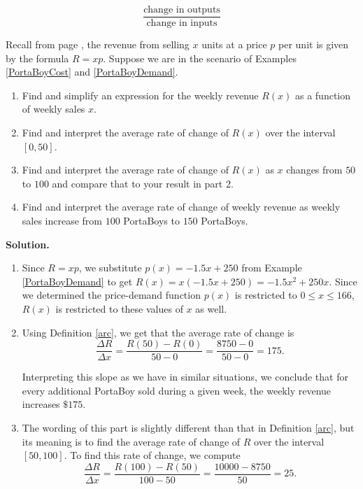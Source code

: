 \[ \dfrac{\mbox{change in outputs}}{\mbox{change in inputs}}\] 

\begin{ex} Recall from page  \pageref{pricerevenuecostprofit}, the revenue from selling $x$ units at a price $p$ per unit is given by the formula  $R=xp$.  Suppose we are in the scenario of Examples \ref{PortaBoyCost} and \ref{PortaBoyDemand}.
\label{PortaBoyRevenue}

\begin{enumerate}

\item  Find and simplify an expression for the weekly revenue $R(x)$ as a function of weekly sales $x$.

\item  Find and interpret the average rate of change of $R(x)$ over the interval $[0,50]$.

\item  Find and interpret the average rate of change of $R(x)$ as $x$ changes from $50$ to $100$ and compare that to your result in part 2.

\item  Find and interpret the average rate of change of weekly revenue as weekly sales increase from $100$ PortaBoys to $150$ PortaBoys.


\end{enumerate}

{\bf Solution.}

\begin{enumerate}

\item  Since $R = xp$, we substitute $p(x) = -1.5x + 250$ from Example \ref{PortaBoyDemand} to get $R(x) = x (-1.5x + 250) = -1.5x^2+250x$. Since we determined the price-demand function $p(x)$ is restricted to $0 \leq x \leq 166$, $R(x)$ is restricted to these values of $x$ as well.

\item  Using Definition \ref{arc}, we get that the average rate of change is \[ \dfrac{\Delta R}{\Delta x} = \dfrac{R(50) - R(0)}{50 - 0} = \dfrac{8750 - 0}{50 - 0} = 175.\]

Interpreting this slope as we have in similar situations, we conclude that for every additional PortaBoy sold during a given week, the weekly revenue increases $\$ 175$.

\item  The wording of this part is slightly different than that in Definition 
\ref{arc}, but its meaning is to find the average rate of change of $R$ over the interval $[50,100]$.  To find this rate of change, we compute \[ \dfrac{\Delta R}{\Delta x} = \dfrac{R(100) - R(50)}{100-50} = \dfrac{10000 - 8750}{50} = 25.\]


\end{enumerate}
\end{ex}
